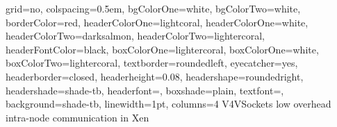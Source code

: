 \documentclass[a0paper,portrait,final]{baposter}
\begin{document}
\newlength{\leftimgwidth}
\begin{poster}%
  {
  grid=no,
  colspacing=0.5em,
  bgColorOne=white,
  bgColorTwo=white,
  borderColor=red,
  headerColorOne=lightcoral,
  headerColorOne=white,
  headerColorTwo=darksalmon,
  headerColorTwo=lightercoral,
  headerFontColor=black,
  boxColorOne=lightercoral,
  boxColorOne=white,
  boxColorTwo=lightercoral,
  textborder=roundedleft,
  eyecatcher=yes,
  headerborder=closed,
  headerheight=0.08\textheight,
  headershape=roundedright,
  headershade=shade-tb,
  headerfont=\Large\textsf, %
  boxshade=plain,
  textfont={\sf },
  background=shade-tb,
  linewidth=1pt,
  columns=4
  }
  {
   }
  {\sc V4VSockets}
  { \huge low overhead intra-node communication in Xen}
  {   
   }


\end{poster}
\end{document}

